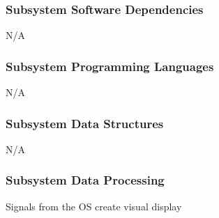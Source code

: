 \subsubsection{Subsystem Software Dependencies}
N/A

\subsubsection{Subsystem Programming Languages}
N/A

\subsubsection{Subsystem Data Structures}
N/A

\subsubsection{Subsystem Data Processing}
Signals from the OS create visual display


 
